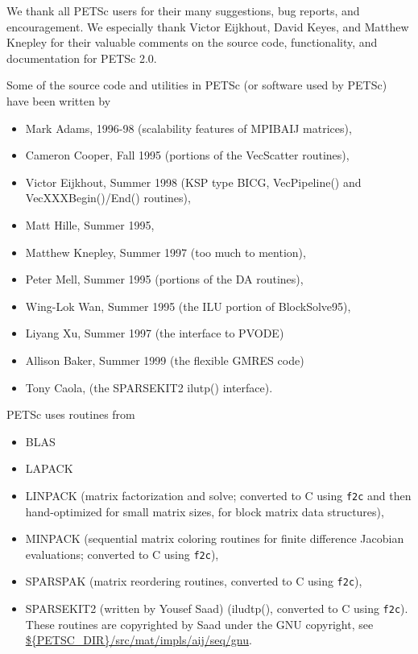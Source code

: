 %
%

\medskip \medskip \noindent
We thank all PETSc users for their many suggestions, bug reports, and
encouragement.  We especially thank Victor Eijkhout, David Keyes, and
Matthew Knepley for their valuable comments on the source code,
functionality, and documentation for PETSc 2.0.


\vspace{.3in}
\noindent
Some of the source code and utilities in PETSc (or software used by PETSc)
have been written by 
\begin{itemize}
  \item Mark Adams, 1996-98 (scalability features of MPIBAIJ matrices),
  \item Cameron Cooper, Fall 1995 (portions of the VecScatter routines), 
  \item Victor Eijkhout, Summer 1998 (KSP type BICG, VecPipeline() and VecXXXBegin()/End() routines), 
  \item Matt Hille, Summer 1995,
  \item Matthew Knepley, Summer 1997 (too much to mention),
  \item Peter Mell, Summer 1995 (portions of the DA routines),
  \item Wing-Lok Wan, Summer 1995 (the ILU portion of BlockSolve95),
  \item Liyang Xu, Summer 1997 (the interface to PVODE)
  \item Allison Baker, Summer 1999 (the flexible GMRES code)
  \item Tony Caola, (the SPARSEKIT2 ilutp() interface).
\end{itemize}

\vspace{.3in}
\noindent
PETSc uses routines from 
\begin{itemize}
  \item BLAS
  \item LAPACK
  \item LINPACK      (matrix factorization and solve; converted to C using {\tt f2c} and then 
                      hand-optimized for small matrix sizes, for block matrix data structures),
  \item MINPACK      (sequential matrix coloring routines for finite difference Jacobian
                       evaluations; converted to C using {\tt f2c}),
  \item SPARSPAK     (matrix reordering routines, converted to C using {\tt f2c}),
  \item SPARSEKIT2 (written by Yousef Saad) (iludtp(), converted to C using {\tt f2c}). These routines 
                     are copyrighted by Saad under the GNU copyright, see \url{${PETSC_DIR}/src/mat/impls/aij/seq/gnu}.
\end{itemize}



